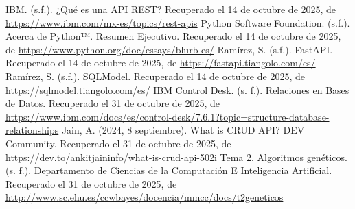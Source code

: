 \documentclass[12pt]{article}
\begin{document}
\begin{thebibliography}{99}

     IBM. (s.f.). ¿Qué es una API REST? Recuperado el 14 de octubre de 2025, de \url{https://www.ibm.com/mx-es/topics/rest-apis}
     Python Software Foundation. (s.f.). Acerca de Python™. Resumen Ejecutivo. Recuperado el 14 de octubre de 2025, de \url{https://www.python.org/doc/essays/blurb-es/}
     Ramírez, S. (s.f.). FastAPI. Recuperado el 14 de octubre de 2025, de \url{https://fastapi.tiangolo.com/es/}
     Ramírez, S. (s.f.). SQLModel. Recuperado el 14 de octubre de 2025, de \url{https://sqlmodel.tiangolo.com/es/}
     IBM Control Desk. (s. f.). Relaciones en Bases de Datos. Recuperado el 31 de octubre de 2025, de \url{ https://www.ibm.com/docs/es/control-desk/7.6.1?topic=structure-database-relationships}
     Jain, A. (2024, 8 septiembre). What is CRUD API? DEV Community. Recuperado el 31 de octubre de 2025, de \url{https://dev.to/ankitjaininfo/what-is-crud-api-502i}
     Tema 2. Algoritmos genéticos. (s. f.). Departamento de Ciencias de la Computación E Inteligencia Artificial. Recuperado el 31 de octubre de 2025, de \url{http://www.sc.ehu.es/ccwbayes/docencia/mmcc/docs/t2geneticos}

\end{thebibliography}
\end{document}
